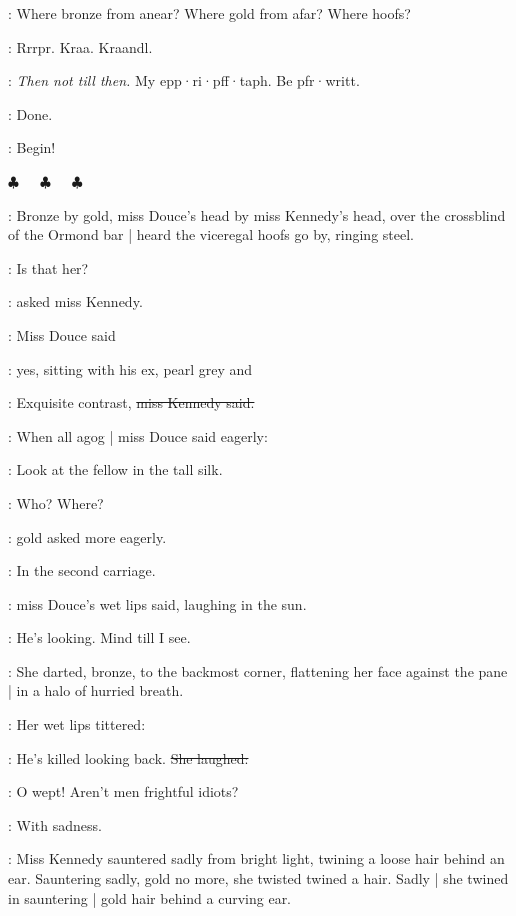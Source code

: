 \Bloom:
Where bronze from anear?
Where gold from afar?
Where hoofs?

:
Rrrpr.
Kraa.
Kraandl.

\emmet:
\emph{Then not till then.}
My epp·ri·pff·taph.
Be pfr·writt.

\Bloom:
Done.

\conductor:
Begin!

\begin{center}
  $\clubsuit$~~~$\clubsuit$~~~$\clubsuit$
\end{center}

\pagebreak[2]


:
Bronze by gold,
miss Douce's head by miss Kennedy's head,
over the crossblind of the Ormond bar |
heard the viceregal hoofs go by,
ringing steel.

\MissK:
Is that her?

:
asked miss Kennedy.

:
Miss Douce said

\MissD:
yes,
sitting with his ex,
pearl grey and 

\MissK:
Exquisite contrast,
\sout{miss Kennedy said.}

:
When all agog |
miss Douce said eagerly:

\MissD:
Look at the fellow
in the tall silk.

\MissK:
Who?
Where?

:
gold asked more eagerly.

\MissD:
In the second carriage.

:
miss Douce's wet lips said,
laughing in the sun.

\MissD:
He's looking.
Mind till I see.

:
She darted,
bronze,
to the backmost corner,
flattening her face against the pane |
in a halo of hurried breath.

:
Her wet lips tittered:

\MissD:
He's killed looking back.
\stage{[laughs]}
\sout{She laughed:}

\MissD:
O wept!
Aren't men frightful idiots?

:
With sadness.

:
Miss Kennedy sauntered sadly from bright light,
twining a loose hair behind an ear.
Sauntering sadly,
gold no more,
she twisted twined a hair.
Sadly |
she twined in sauntering |
gold hair behind a curving ear.

